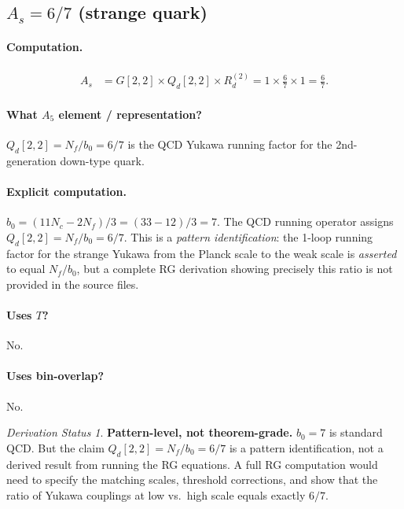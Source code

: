 \documentclass[11pt]{article}
\theoremstyle{remark}
\newtheorem*{status}{Derivation Status}
\begin{document}
\subsection{$A_s = 6/7$ \quad (strange quark)}

\paragraph{Computation.}
\begin{align}
A_s &= G[2,2] \times Q_d[2,2] \times R_d^{(2)} = 1 \times \frac{6}{7} \times 1 = \frac{6}{7}.
\end{align}

\paragraph{What $A_5$ element / representation?}
$Q_d[2,2] = N_f / b_0 = 6/7$ is the QCD Yukawa running factor for the 2nd-generation down-type quark.

\paragraph{Explicit computation.}
$b_0 = (11 N_c - 2 N_f)/3 = (33 - 12)/3 = 7$.
The QCD running operator assigns $Q_d[2,2] = N_f/b_0 = 6/7$.
This is a \emph{pattern identification}: the 1-loop running factor for the strange Yukawa from the Planck scale to the weak scale is \emph{asserted} to equal $N_f/b_0$, but a complete RG derivation showing precisely this ratio is not provided in the source files.

\paragraph{Uses $T$?} No.
\paragraph{Uses bin-overlap?} No.

\begin{status}
\textbf{Pattern-level, not theorem-grade.}
$b_0 = 7$ is standard QCD.
But the claim $Q_d[2,2] = N_f/b_0 = 6/7$ is a pattern identification, not a derived result from running the RG equations.
A full RG computation would need to specify the matching scales, threshold corrections, and show that the ratio of Yukawa couplings at low vs.\ high scale equals exactly $6/7$.
\end{status}

\end{document}
